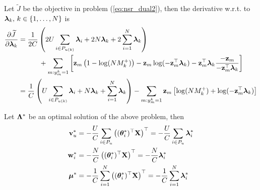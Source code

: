 {Let $\widetilde J$ be the objective in problem (\ref{eq:nsr_dual2}), 
then the derivative w.r.t. to $\bm{\lambda}_k, \, k \in \{1,\dots,N\}$ is
\begin{equation*}
\begin{aligned}
\frac{\partial \widetilde J} {\partial \bm{\lambda}_k}
&= \frac{1}{2C} \left( 2U \sum_{i \in P_{u(k)}} \bm{\lambda}_i + 2N \bm{\lambda}_k + 2 \sum_{i=1}^N \bm{\lambda}_k \right) \\
& \hspace{3em}
   + \sum_{m:y_m^k = 1} \left[ \mathbf{z}_m \left( 1 - \log(N M_k^+) \right) 
     - \mathbf{z}_m \log(-\mathbf{z}_m^\top \bm{\lambda}_k) - \mathbf{z}_m^\top \bm{\lambda}_k \frac{-\mathbf{z}_m}{-\mathbf{z}_m^\top \bm{\lambda}_k} \right] \\
&= \frac{1}{C} \left( U \sum_{i \in P_{u(k)}} \bm{\lambda}_i + N \bm{\lambda}_k + \sum_{i=1}^N \bm{\lambda}_k \right) 
   - \sum_{m:y_m^k = 1} \mathbf{z}_m \left[ \log(N M_k^+) + \log(-\mathbf{z}_m^\top \bm{\lambda}_k) \right] \\
\end{aligned}
\end{equation*}


Let $\mathbf{\Lambda}^*$ be an optimal solution of the above problem, then
\begin{equation*}
\begin{aligned}
\bv_u^*
&= -\frac{U}{C} \sum_{i \in P_u} \left( (\thetabm_i^*)^\top \X \right)^\top 
 = -\frac{U}{C} \sum_{i \in P_u} \lambdabm_i^* \\
%
\w_i^*
&= -\frac{N}{C} \left( (\thetabm_i^*)^\top \X \right)^\top 
 = -\frac{N}{C} \lambdabm_i^* \\
%
\mubm^*
&= -\frac{1}{C} \sum_{i=1}^N \left( (\thetabm_i^*)^\top \X \right)^\top 
 = -\frac{1}{C} \sum_{i=1}^N \lambdabm_i^*
\end{aligned}
\end{equation*}
}
